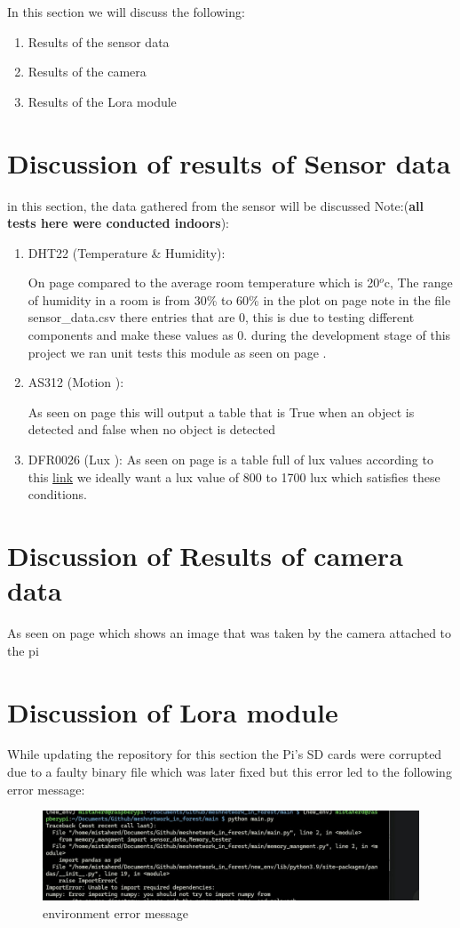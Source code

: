 In this section we will discuss the following:
\begin{enumerate}
    \item Results of the sensor data
    \item Results of the camera
    \item Results of the Lora module
\end{enumerate}
\section{Discussion of results of Sensor data}
in this section, the data gathered from the sensor will be discussed Note:(\textbf{all tests here were conducted indoors}):
\begin{enumerate}
    \item DHT22 (Temperature \& Humidity):

    On page \pageref{Recorded data from  DHT22 on the 5th of March} compared to the average room temperature which is  20$^o$c, The range of humidity in a room is from 30\% to 60\% in the plot on page \pageref{Temperature and Humidity plotted overtime} note in the file sensor\_data.csv there entries that are 0, this is due to testing different components and make these values as  0. during the development stage of this project we ran unit tests this module as seen on page \pageref{unit test message for DHT22 module}.
    \item AS312 (Motion ):

    As seen on page \pageref{Recorded data from AS312 on the \today} this will output a table that is True when an object is detected and  false when no object is  detected

    \item DFR0026 (Lux ):
    As seen on page \pageref{Recorded data from DFR0026 on the 25th of March 2024} is a table full of lux values according to this \href{https://www.thoughtco.com/lighting-levels-by-room-1206643}{link} we ideally want a lux value of  800 to 1700 lux which satisfies these conditions.
\end{enumerate}
\section{Discussion of Results of camera data}
As seen on page \pageref{A photo from 25th of March 2024} which shows  an image that was taken by the camera  attached to  the pi
\section{Discussion of Lora module}
\label{Discussion of Lora module}
While updating the repository for this section the Pi's SD cards were corrupted due to  a faulty binary file which was  later fixed  but  this error led to the following error message:

\begin{figure}[h!]
    \centering
    \includegraphics[width=0.5\linewidth]{Images/error_message.jpeg}
    \caption{environment error message}
    \label{environment error message}
\end{figure}